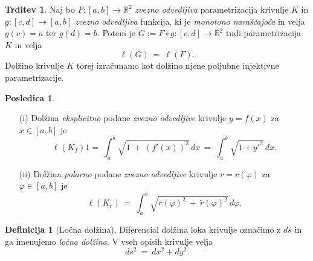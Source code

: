 \documentclass[11pt]{article}
\newcommand{\R}{\mathbb{R}}
\theoremstyle{definition}
\newtheorem{definicija}{Definicija}[section]
\theoremstyle{definition}
\newtheorem{trditev}{Trditev}[section]
\theoremstyle{definition}
\theoremstyle{theorem}
\newtheorem*{posledica}{Posledica}
\begin{document}
\begin{trditev}

Naj bo $F: [a, b] \rightarrow \R^2$ \textit{zvezno odvedljiva} parametrizacija krivulje $K$ in $g: [c, d] \rightarrow [a, b]$ \textit{zvezno odvedljiva} funkcija, ki je \textit{monotono naraščajoča} in velja $g(c) = a$ ter $g(d) = b$. Potem je $G := F \circ g: [c, d] \rightarrow \R^2$ tudi parametrizacija $K$ in velja 
$$\ell(G) ~=~ \ell(F).$$
Dolžino krivulje $K$ torej izračunamo kot dolžino njene poljubne injektivne parametrizacije.

\end{trditev}
\vspace{0.5cm}

\begin{posledica}
~
\begin{enumerate}
	\item[(i)] Dolžina \textit{eksplicitno} podane \textit{zvezno odvedljive} krivulje
	$y = f(x)$ za $x \in [a, b]$ je
	$$\ell(K_f) 1=~ \int_a^b \sqrt{1 ~+~ (f'(x))^2}\,dx ~=~ \int_a^b \sqrt{1 + {y'}^2}\,dx.$$

	\item[(ii)] Dolžina \textit{polarno} podane \textit{zvezno odvedljive} krivulje $r = 	r(\varphi)$ za $\varphi \in [a, b]$ je
	$$\ell(K_r) ~=~ \int_a^b \sqrt{r(\varphi)^2 ~+~ \dot{r}(\varphi)^2}\,d\varphi.$$
\end{enumerate}
\end{posledica}
\vspace{0.5cm}

\begin{definicija}[Ločna dolžina]

Diferencial dolžina loka krivulje označimo z $ds$ in ga imenujemo \textit{ločna dolžina}. V vseh opisih krivulje velja 
$$ds^2 ~=~ dx^2 + dy^2.$$

\end{definicija}
\vspace{0.5cm}
\end{document}

